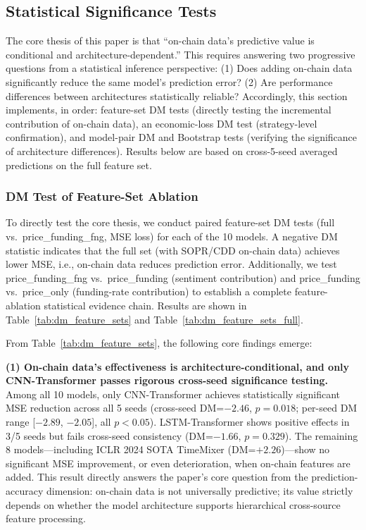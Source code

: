 \documentclass[a4paper]{cas-dc}
\begin{document}
\subsection{Statistical Significance Tests}

The core thesis of this paper is that ``on-chain data's predictive value is conditional and architecture-dependent.'' This requires answering two progressive questions from a statistical inference perspective: (1) Does adding on-chain data significantly reduce the same model's prediction error? (2) Are performance differences between architectures statistically reliable? Accordingly, this section implements, in order: feature-set DM tests (directly testing the incremental contribution of on-chain data), an economic-loss DM test (strategy-level confirmation), and model-pair DM and Bootstrap tests (verifying the significance of architecture differences). Results below are based on cross-5-seed averaged predictions on the full feature set.

\subsubsection{DM Test of Feature-Set Ablation}

To directly test the core thesis, we conduct paired feature-set DM tests (full vs.\ price\_funding\_fng, MSE loss) for each of the 10 models. A negative DM statistic indicates that the full set (with SOPR/CDD on-chain data) achieves lower MSE, i.e., on-chain data reduces prediction error. Additionally, we test price\_funding\_fng vs.\ price\_funding (sentiment contribution) and price\_funding vs.\ price\_only (funding-rate contribution) to establish a complete feature-ablation statistical evidence chain. Results are shown in Table~\ref{tab:dm_feature_sets} and Table~\ref{tab:dm_feature_sets_full}.



From Table~\ref{tab:dm_feature_sets}, the following core findings emerge:

\textbf{(1) On-chain data's effectiveness is architecture-conditional, and only CNN-Transformer passes rigorous cross-seed significance testing.} Among all 10 models, only CNN-Transformer achieves statistically significant MSE reduction across all 5 seeds (cross-seed DM=$-2.46$, $p=0.018$; per-seed DM range [$-2.89$, $-2.05$], all $p<0.05$). LSTM-Transformer shows positive effects in 3/5 seeds but fails cross-seed consistency (DM=$-1.66$, $p=0.329$). The remaining 8 models---including ICLR 2024 SOTA TimeMixer (DM=$+2.26$)---show no significant MSE improvement, or even deterioration, when on-chain features are added. This result directly answers the paper's core question from the prediction-accuracy dimension: on-chain data is not universally predictive; its value strictly depends on whether the model architecture supports hierarchical cross-source feature processing.
\end{document}
